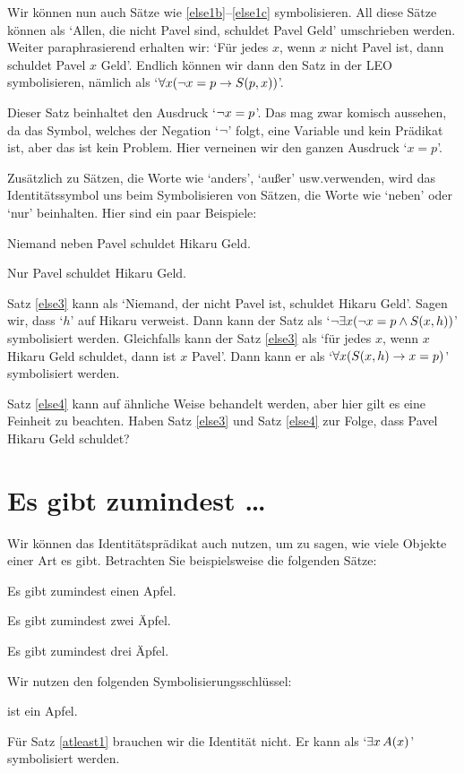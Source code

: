 Wir können nun auch Sätze wie \ref{else1b}--\ref{else1c} symbolisieren. All diese Sätze können als `Allen, die nicht Pavel sind, schuldet Pavel Geld' umschrieben werden. Weiter paraphrasierend erhalten wir: `Für jedes $x$, wenn $x$ nicht Pavel ist, dann schuldet Pavel $x$ Geld'. Endlich können wir dann den Satz in der LEO symbolisieren, nämlich als `$\forall x (\neg x = p \rightarrow \mathord{S}(p,x))$'.

Dieser Satz beinhaltet den Ausdruck `$\neg x = p$'. Das mag zwar komisch aussehen, da das Symbol, welches der Negation `$\neg$' folgt, eine Variable und kein Prädikat ist, aber das ist kein Problem. Hier verneinen wir den ganzen Ausdruck `$x = p$'. 


Zusätzlich zu Sätzen, die Worte wie `anders', `au{\ss}er' usw.\@ verwenden, wird das Identitätssymbol uns beim Symbolisieren von Sätzen, die Worte wie `neben' oder `nur' beinhalten. Hier sind ein paar Beispiele:

\begin{earg}
\item[\ex{else3}] Niemand neben Pavel schuldet Hikaru Geld.
\item[\ex{else4}] Nur Pavel schuldet Hikaru Geld.
\end{earg}
Satz \ref{else3} kann als `Niemand, der nicht Pavel ist, schuldet Hikaru Geld'. Sagen wir, dass `$h$' auf Hikaru verweist. Dann kann der Satz als `$\neg\exists x(\neg x = p \wedge \mathord{S}(x,h))$' symbolisiert werden. Gleichfalls kann der Satz \ref{else3} als `für jedes $x$, wenn $x$ Hikaru Geld schuldet, dann ist $x$ Pavel'. Dann kann er als `$\forall x (\mathord{S}(x,h) \rightarrow x = p)$' symbolisiert werden.

Satz \ref{else4} kann auf ähnliche Weise behandelt werden, aber hier gilt es eine Feinheit zu beachten. Haben Satz \ref{else3} und Satz \ref{else4} zur Folge, dass Pavel Hikaru Geld schuldet?

\section{Es gibt zumindest \ldots}
Wir können das Identitätsprädikat auch nutzen, um zu sagen, wie viele Objekte einer Art es gibt. Betrachten Sie beispielsweise die folgenden Sätze:
\begin{earg}
\item[\ex{atleast1}] Es gibt zumindest einen Apfel.
\item[\ex{atleast2}] Es gibt zumindest zwei Äpfel.
\item[\ex{atleast3}] Es gibt zumindest drei Äpfel.
\end{earg}
Wir nutzen den folgenden Symbolisierungsschlüssel:
	\begin{ekey}
		\item[\atom{A}{x}]  ist ein Apfel.
	\end{ekey}
Für Satz \ref{atleast1} brauchen wir die Identität nicht. Er kann als `$\exists x\, \mathord{A}(x)$' symbolisiert werden.

